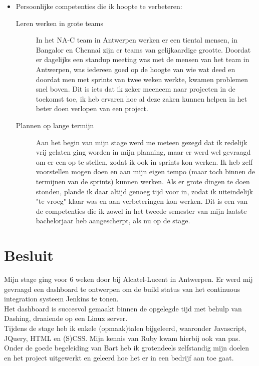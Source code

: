 \documentclass[10pt,a4paper]{article}
\begin{document}
\begin{itemize}
\begin{description}
\end{description}
\item Persoonlijke competenties die ik hoopte te verbeteren:
\begin{description}
\item[Leren werken in grote teams] In het NA-C team in Antwerpen werken er een tiental mensen, in Bangalor en Chennai zijn er teams van gelijkaardige grootte. Doordat er dagelijks een standup meeting was met de mensen van het team in Antwerpen, was iedereen goed op de hoogte van wie wat deed en doordat men met sprints van twee weken werkte, kwamen problemen snel boven. Dit is iets dat ik zeker meeneem naar projecten in de toekomst toe, ik heb ervaren hoe al deze zaken kunnen helpen in het beter doen verlopen van een project.
\item[Plannen op lange termijn] Aan het begin van mijn stage werd me meteen gezegd dat ik redelijk vrij gelaten ging worden in mijn planning, maar er werd wel gevraagd om er een op te stellen, zodat ik ook in sprints kon werken. Ik heb zelf voorstellen mogen doen en aan mijn eigen tempo (maar toch binnen de termijnen van de sprints) kunnen werken. Als er grote dingen te doen stonden, plande ik daar altijd genoeg tijd voor in, zodat ik uiteindelijk "te vroeg" klaar was en aan verbeteringen kon werken. Dit is een van de competenties die ik zowel in het tweede semester van mijn laatste bachelorjaar heb aangescherpt, als nu op de stage.  
\end{description}
\end{itemize}

\section{Besluit}
\label{besluit}
Mijn stage ging voor 6 weken door bij Alcatel-Lucent in Antwerpen. Er werd mij gevraagd een dashboard te ontwerpen om de build status van het continuous integration systeem Jenkins te tonen.\\
Het dashboard is succesvol gemaakt binnen de opgelegde tijd met behulp van Dashing, draaiende op een Linux server.\\
Tijdens de stage heb ik enkele (opmaak)talen bijgeleerd, waaronder Javascript, JQuery, HTML en (S)CSS. Mijn kennis van Ruby kwam hierbij ook van pas.\\
Onder de goede begeleiding van Bart heb ik grotendeels zelfstandig mijn doelen en het project uitgewerkt en geleerd hoe het er in een bedrijf aan toe gaat.

\clearpage
\end{document}

